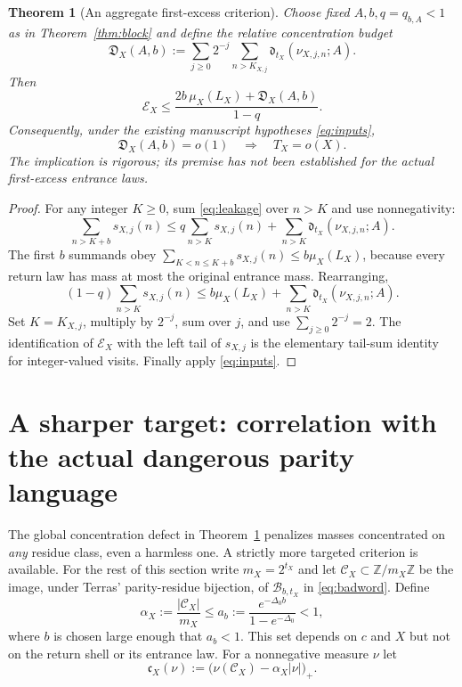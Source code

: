 \documentclass[11pt,a4paper]{article}
\newtheorem{theorem}{Theorem}
\begin{document}
\begin{theorem}[An aggregate first-excess criterion]\label{thm:aggregate}
Choose fixed $A,b,q=q_{b,A}<1$ as in Theorem~\ref{thm:block} and define the \emph{relative concentration budget}
\begin{equation}\label{eq:budget}
 \mathfrak D_X(A,b):=\sum_{j\ge0}2^{-j}\sum_{n>K_{X,j}}\mathfrak d_{t_X}(\nu_{X,j,n};A).
\end{equation}
Then
\begin{equation}\label{eq:main}
 \boxed{\quad\mathcal E_X\le\frac{2b\,\mu_X(L_X)+\mathfrak D_X(A,b)}{1-q}.\quad}
\end{equation}
Consequently, under the existing manuscript hypotheses \eqref{eq:inputs},
\begin{equation}\label{eq:criterion}
 \mathfrak D_X(A,b)=o(1)\quad\Longrightarrow\quad T_X=o(X).
\end{equation}
The implication is rigorous; its premise has \emph{not} been established for the actual first-excess entrance laws.
\end{theorem}
\begin{proof}
For any integer $K\ge0$, sum \eqref{eq:leakage} over $n>K$ and use nonnegativity:
\[
 \sum_{n>K+b}s_{X,j}(n)\le q\sum_{n>K}s_{X,j}(n)+\sum_{n>K}\mathfrak d_{t_X}(\nu_{X,j,n};A).
\]
The first $b$ summands obey $\sum_{K<n\le K+b}s_{X,j}(n)\le b\mu_X(L_X)$, because every return law has mass at most the original entrance mass. Rearranging,
\[
 (1-q)\sum_{n>K}s_{X,j}(n)\le b\mu_X(L_X)+\sum_{n>K}\mathfrak d_{t_X}(\nu_{X,j,n};A).
\]
Set $K=K_{X,j}$, multiply by $2^{-j}$, sum over $j$, and use $\sum_{j\ge0}2^{-j}=2$. The identification of $\mathcal E_X$ with the left tail of $s_{X,j}$ is the elementary tail-sum identity for integer-valued visits. Finally apply \eqref{eq:inputs}.
\end{proof}

\section{A sharper target: correlation with the actual dangerous parity language}
The global concentration defect in Theorem~\ref{thm:aggregate} penalizes masses concentrated on \emph{any} residue class, even a harmless one. A strictly more targeted criterion is available. For the rest of this section write $m_X=2^{t_X}$ and let $\mathcal C_X\subset\mathbb Z/m_X\mathbb Z$ be the image, under Terras' parity-residue bijection, of $\mathcal B_{b,t_X}$ in \eqref{eq:badword}. Define
\[
  \alpha_X:=\frac{|\mathcal C_X|}{m_X}\le a_b:=\frac{e^{-\Delta_0b}}{1-e^{-\Delta_0}}<1,
\]
where $b$ is chosen large enough that $a_b<1$. This set depends on $c$ and $X$ but not on the return shell or its entrance law. For a nonnegative measure $\nu$ let
\begin{equation}\label{eq:spectraldefect}
 \mathfrak c_X(\nu):=\bigl(\nu(\mathcal C_X)-\alpha_X|\nu|\bigr)_+.
\end{equation}
\end{document}
